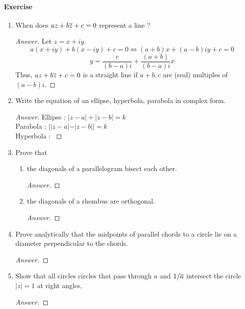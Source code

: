 \paragraph{Exercise}
\begin{enumerate}
	\item When does $az+b\overline{z}+c = 0$ represent a line ?
		\begin{proof}[Answer]
			Let $z = x+iy$.
			\[ a(x+iy) + b(x-iy) + c = 0 \iff (a+b)x+(a-b)iy + c = 0 \]
			\[ y = \frac{c}{(b-a)i}+\frac{(a+b)}{(b-a)i}x \]
			Thus, $az+b\overline{z}+c = 0$ is a straight line if $a+b,c$ are (real) multiples of $(a-b)i$.
		\end{proof}
	\item Write the equation of an ellipse, hyperbola, parabola in complex form.
		\begin{proof}[Answer]
		Ellipse : $|z-a|+|z-b|=k$ \\
		Parabola : $||z-a|-|z-b|| = k$ \\
		Hyperbola : $ $
		\end{proof}
	\item Prove that
		\begin{enumerate}
			\item the diagonals of a parallelogram bisect each other.
			\begin{proof}[Answer]
			\end{proof}

			\item the diagonals of a rhombus are orthogonal.
			\begin{proof}[Answer]
			\end{proof}
		\end{enumerate}
	\item Prove analytically that the midpoints of parallel chords to a circle lie on a diameter perpendicular to the chords.
	\begin{proof}[Answer]
	\end{proof}

	\item Show that all circles circles that pass through $a$ and $1/\overline{a}$ intersect the circle $|z|=1$ at right angles.
	\begin{proof}[Answer]
	\end{proof}
\end{enumerate}
